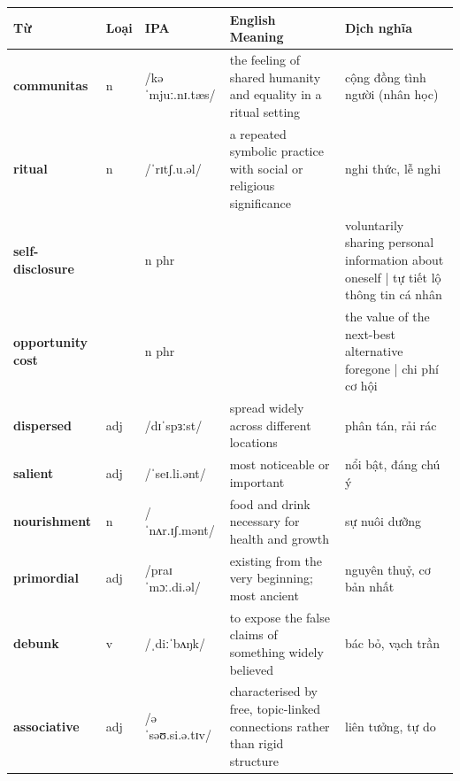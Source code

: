 \vspace{0.8em}
\begin{center}
\renewcommand{\arraystretch}{1.65}
\begin{tabularx}{\textwidth}{|V{0.22\textwidth}|C{0.07\textwidth}|I{0.20\textwidth}|Y|V{0.18\textwidth}|}
\hline
{}
\textbf{Từ} & \textbf{Loại} & \textbf{IPA} & \textbf{English Meaning} & \textbf{Dịch nghĩa} \\
\hline
\textbf{communitas} & n & /kəˈmjuː.nɪ.tæs/ & the feeling of shared humanity and equality in a ritual setting & cộng đồng tình người (nhân học) \\ \hline
\textbf{ritual} & n & /ˈrɪtʃ.u.əl/ & a repeated symbolic practice with social or religious significance & nghi thức, lễ nghi \\ \hline
\textbf{self-disclosure} & & n phr & & voluntarily sharing personal information about oneself | tự tiết lộ thông tin cá nhân \\ \hline
\textbf{opportunity cost} & & n phr & & the value of the next-best alternative foregone | chi phí cơ hội \\ \hline
\textbf{dispersed} & adj & /dɪˈspɜːst/ & spread widely across different locations & phân tán, rải rác \\ \hline
\textbf{salient} & adj & /ˈseɪ.li.ənt/ & most noticeable or important & nổi bật, đáng chú ý \\ \hline
\textbf{nourishment} & n & /ˈnʌr.ɪʃ.mənt/ & food and drink necessary for health and growth & sự nuôi dưỡng \\ \hline
\textbf{primordial} & adj & /praɪˈmɔː.di.əl/ & existing from the very beginning; most ancient & nguyên thuỷ, cơ bản nhất \\ \hline
\textbf{debunk} & v & /ˌdiːˈbʌŋk/ & to expose the false claims of something widely believed & bác bỏ, vạch trần \\ \hline
\textbf{associative} & adj & /əˈsəʊ.si.ə.tɪv/ & characterised by free, topic-linked connections rather than rigid structure & liên tưởng, tự do \\ \hline
\end{tabularx}
\end{center}

\newpage


